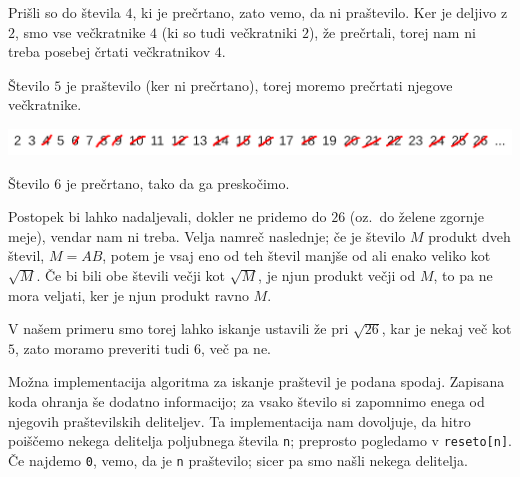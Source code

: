 Prišli so do števila $4$, ki je prečrtano, zato vemo, da ni praštevilo.
Ker je deljivo z $2$, smo vse večkratnike $4$ (ki so tudi večkratniki $2$), že
prečrtali, torej nam ni treba posebej črtati večkratnikov $4$.

Število $5$ je praštevilo (ker ni prečrtano), torej moremo prečrtati njegove
večkratnike.

\includegraphics[width=\linewidth]{chapters/teorija-stevil/slike/reseto4}

Število $6$ je prečrtano, tako da ga preskočimo.

Postopek bi lahko nadaljevali, dokler ne pridemo do $26$ (oz.~do želene zgornje
meje), vendar nam ni treba.
Velja namreč naslednje; če je število $M$ produkt dveh števil, $M = A B$, potem
je vsaj eno od teh števil manjše od ali enako veliko kot $\sqrt{M}$.
Če bi bili obe števili večji kot $\sqrt{M}$, je njun produkt večji od $M$, to pa
ne mora veljati, ker je njun produkt ravno $M$.

V našem primeru smo torej lahko iskanje ustavili že pri $\sqrt{26}$, kar je
nekaj več kot $5$, zato moramo preveriti tudi $6$, več pa ne.

\begin{examples}
  Možna implementacija algoritma za iskanje praštevil je podana spodaj.
  Zapisana koda ohranja še dodatno informacijo; za vsako število si zapomnimo
  enega od njegovih praštevilskih deliteljev.
  Ta implementacija nam dovoljuje, da hitro poiščemo nekega delitelja poljubnega
  števila \verb+n+; preprosto pogledamo v \verb+reseto[n]+.
  Če najdemo \verb+0+, vemo, da je \verb+n+ praštevilo; sicer pa smo našli
  nekega delitelja.
\end{examples}

